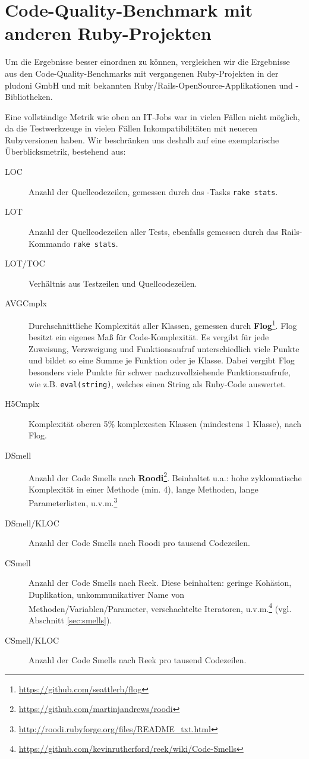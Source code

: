 \section{Code-Quality-Benchmark mit anderen Ruby-Projekten}

Um die Ergebnisse besser einordnen zu können, vergleichen wir die Ergebnisse aus den Code-Quality-Benchmarks mit vergangenen Ruby-Projekten in der pludoni GmbH und mit bekannten Ruby/Rails-OpenSource-Applikationen und -Bibliotheken.

Eine vollständige Metrik wie oben an IT-Jobs war in vielen Fällen nicht möglich, da die Testwerkzeuge in vielen Fällen Inkompatibilitäten mit neueren Rubyversionen haben. Wir beschränken uns deshalb auf eine exemplarische Überblicksmetrik, bestehend aus:

\begin{description}
 \item[LOC] Anzahl der Quellcodezeilen, gemessen durch das -Tasks \texttt{rake stats}.
 \item[LOT] Anzahl der Quellcodezeilen aller Tests, ebenfalls gemessen durch das Rails-Kommando \texttt{rake stats}.
 \item[LOT/TOC] Verhältnis aus Testzeilen und Quellcodezeilen.
 \item[AVGCmplx] Durchschnittliche Komplexität aller Klassen, gemessen durch \textbf{Flog}\footnote{\url{https://github.com/seattlerb/flog}}. Flog besitzt ein eigenes Maß für Code-Komplexität. Es vergibt für jede Zuweisung, Verzweigung und Funktionsaufruf unterschiedlich viele Punkte und bildet so eine Summe je Funktion oder je Klasse. Dabei vergibt Flog besonders viele Punkte für schwer nachzuvollziehende Funktionsaufrufe, wie z.B. \texttt{eval(string)}, welches einen String als Ruby-Code auswertet.
 \item[H5Cmplx] Komplexität oberen 5\% komplexesten Klassen (mindestens 1 Klasse), nach Flog.
 \item[DSmell] Anzahl der Code Smells nach \textbf{Roodi}\footnote{\url{https://github.com/martinjandrews/roodi}}. Beinhaltet u.a.: hohe zyklomatische Komplexität in einer Methode (min. 4), lange Methoden, lange Parameterlisten, u.v.m.\footnote{\url{http://roodi.rubyforge.org/files/README_txt.html}}
 \item[DSmell/KLOC] Anzahl der Code Smells nach Roodi pro tausend Codezeilen.
 \item[CSmell] Anzahl der Code Smells nach Reek. Diese beinhalten: geringe Kohäsion, Duplikation, unkommunikativer Name von Methoden/Variablen/Parameter, verschachtelte Iteratoren, u.v.m.\footnote{\url{https://github.com/kevinrutherford/reek/wiki/Code-Smells}} (vgl. Abschnitt \ref{sec:smells}).
 \item[CSmell/KLOC] Anzahl der Code Smells nach Reek pro tausend Codezeilen.
\end{description}







